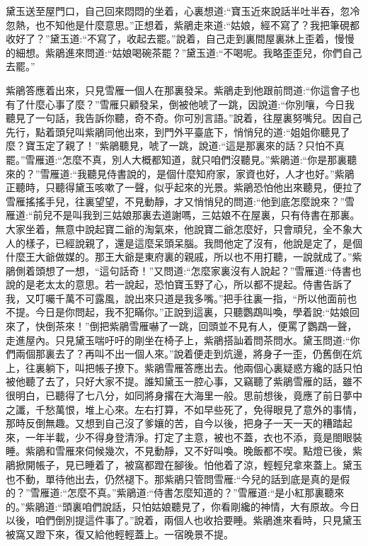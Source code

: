 \begin{parag}
    黛玉送至屋門口，自己回來悶悶的坐着，心裏想道:“寶玉近來說話半吐半吞，忽冷忽熱，也不知他是什麼意思。”正想着，紫鵑走來道:“姑娘，經不寫了？我把筆硯都收好了？”黛玉道:“不寫了，收起去罷。”說着，自己走到裏間屋裏牀上歪着，慢慢的細想。紫鵑進來問道:“姑娘喝碗茶罷？”黛玉道:“不喝呢。我略歪歪兒，你們自己去罷。”
\end{parag}


\begin{parag}
    紫鵑答應着出來，只見雪雁一個人在那裏發呆。紫鵑走到他跟前問道:“你這會子也有了什麼心事了麼？”雪雁只顧發呆，倒被他唬了一跳，因說道:“你別嚷，今日我聽見了一句話，我告訴你聽，奇不奇。你可別言語。”說着，往屋裏努嘴兒。因自己先行，點着頭兒叫紫鵑同他出來，到門外平臺底下，悄悄兒的道:“姐姐你聽見了麼？寶玉定了親了！”紫鵑聽見，唬了一跳，說道:“這是那裏來的話？只怕不真罷。”雪雁道:“怎麼不真，別人大概都知道，就只咱們沒聽見。”紫鵑道:“你是那裏聽來的？”雪雁道:“我聽見侍書說的，是個什麼知府家，家資也好，人才也好。”紫鵑正聽時，只聽得黛玉咳嗽了一聲，似乎起來的光景。紫鵑恐怕他出來聽見，便拉了雪雁搖搖手兒，往裏望望，不見動靜，才又悄悄兒的問道:“他到底怎麼說來？”雪雁道:“前兒不是叫我到三姑娘那裏去道謝嗎，三姑娘不在屋裏，只有侍書在那裏。大家坐着，無意中說起寶二爺的淘氣來，他說寶二爺怎麼好，只會頑兒，全不象大人的樣子，已經說親了，還是這麼呆頭呆腦。我問他定了沒有，他說是定了，是個什麼王大爺做媒的。那王大爺是東府裏的親戚，所以也不用打聽，一說就成了。”紫鵑側着頭想了一想，“這句話奇！”又問道:“怎麼家裏沒有人說起？”雪雁道:“侍書也說的是老太太的意思。若一說起，恐怕寶玉野了心，所以都不提起。侍書告訴了我，又叮囑千萬不可露風，說出來只道是我多嘴。”把手往裏一指，“所以他面前也不提。今日是你問起，我不犯瞞你。”正說到這裏，只聽鸚鵡叫喚，學着說:“姑娘回來了，快倒茶來！”倒把紫鵑雪雁嚇了一跳，回頭並不見有人，便罵了鸚鵡一聲，走進屋內。只見黛玉喘吁吁的剛坐在椅子上，紫鵑搭訕着問茶問水。黛玉問道:“你們兩個那裏去了？再叫不出一個人來。”說着便走到炕邊，將身子一歪，仍舊倒在炕上，往裏躺下，叫把帳子撩下。紫鵑雪雁答應出去。他兩個心裏疑惑方纔的話只怕被他聽了去了，只好大家不提。誰知黛玉一腔心事，又竊聽了紫鵑雪雁的話，雖不很明白，已聽得了七八分，如同將身撂在大海里一般。思前想後，竟應了前日夢中之讖，千愁萬恨，堆上心來。左右打算，不如早些死了，免得眼見了意外的事情，那時反倒無趣。又想到自己沒了爹孃的苦，自今以後，把身子一天一天的糟踏起來，一年半載，少不得身登清淨。打定了主意，被也不蓋，衣也不添，竟是閤眼裝睡。紫鵑和雪雁來伺候幾次，不見動靜，又不好叫喚。晚飯都不喫。點燈已後，紫鵑掀開帳子，見已睡着了，被窩都蹬在腳後。怕他着了涼，輕輕兒拿來蓋上。黛玉也不動，單待他出去，仍然褪下。那紫鵑只管問雪雁:“今兒的話到底是真的是假的？”雪雁道:“怎麼不真。”紫鵑道:“侍書怎麼知道的？”雪雁道:“是小紅那裏聽來的。”紫鵑道:“頭裏咱們說話，只怕姑娘聽見了，你看剛纔的神情，大有原故。今日以後，咱們倒別提這件事了。”說着，兩個人也收拾要睡。紫鵑進來看時，只見黛玉被窩又蹬下來，復又給他輕輕蓋上。一宿晚景不提。
\end{parag}


